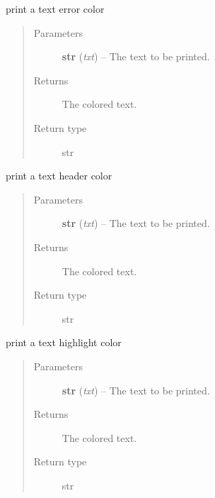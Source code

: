 \documentclass[a4paper,10pt,english]{sphinxmanual}
\begin{document}

\begin{fulllineitems}
\label{commands/apidoc/src:src.printcolors.printcError}
print a text error color
\begin{quote}\begin{description}
\item[{Parameters}] \leavevmode
\textbf{str} (\emph{txt}) -- The text to be printed.

\item[{Returns}] \leavevmode
The colored text.

\item[{Return type}] \leavevmode
str

\end{description}\end{quote}

\end{fulllineitems}


\begin{fulllineitems}
\label{commands/apidoc/src:src.printcolors.printcHeader}
print a text header color
\begin{quote}\begin{description}
\item[{Parameters}] \leavevmode
\textbf{str} (\emph{txt}) -- The text to be printed.

\item[{Returns}] \leavevmode
The colored text.

\item[{Return type}] \leavevmode
str

\end{description}\end{quote}

\end{fulllineitems}


\begin{fulllineitems}
\label{commands/apidoc/src:src.printcolors.printcHighlight}
print a text highlight color
\begin{quote}\begin{description}
\item[{Parameters}] \leavevmode
\textbf{str} (\emph{txt}) -- The text to be printed.

\item[{Returns}] \leavevmode
The colored text.

\item[{Return type}] \leavevmode
str

\end{description}\end{quote}

\end{fulllineitems}
\end{document}
